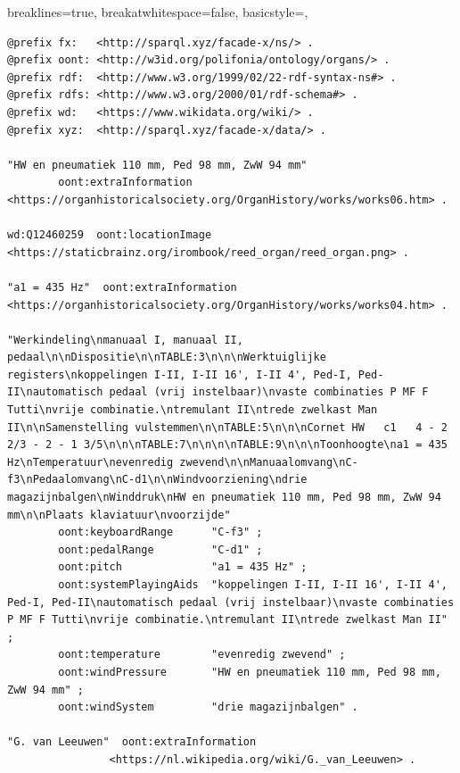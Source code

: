 \lstset
{
    breaklines=true,
    breakatwhitespace=false,
    basicstyle=\linespread{1}\ttfamily,
}
\begin{lstlisting}[caption={Part14\_000GravenhageNoorderkerk}]
@prefix fx:   <http://sparql.xyz/facade-x/ns/> .
@prefix oont: <http://w3id.org/polifonia/ontology/organs/> .
@prefix rdf:  <http://www.w3.org/1999/02/22-rdf-syntax-ns#> .
@prefix rdfs: <http://www.w3.org/2000/01/rdf-schema#> .
@prefix wd:   <https://www.wikidata.org/wiki/> .
@prefix xyz:  <http://sparql.xyz/facade-x/data/> .

"HW en pneumatiek 110 mm, Ped 98 mm, ZwW 94 mm"
        oont:extraInformation  <https://organhistoricalsociety.org/OrganHistory/works/works06.htm> .

wd:Q12460259  oont:locationImage  <https://staticbrainz.org/irombook/reed_organ/reed_organ.png> .

"a1 = 435 Hz"  oont:extraInformation  <https://organhistoricalsociety.org/OrganHistory/works/works04.htm> .

"Werkindeling\nmanuaal I, manuaal II, pedaal\n\nDispositie\n\nTABLE:3\n\n\nWerktuiglijke registers\nkoppelingen I-II, I-II 16', I-II 4', Ped-I, Ped-II\nautomatisch pedaal (vrij instelbaar)\nvaste combinaties P MF F Tutti\nvrije combinatie.\ntremulant II\ntrede zwelkast Man II\n\nSamenstelling vulstemmen\n\nTABLE:5\n\n\nCornet HW   c1   4 - 2 2/3 - 2 - 1 3/5\n\n\nTABLE:7\n\n\n\nTABLE:9\n\n\nToonhoogte\na1 = 435 Hz\nTemperatuur\nevenredig zwevend\n\nManuaalomvang\nC-f3\nPedaalomvang\nC-d1\n\nWindvoorziening\ndrie magazijnbalgen\nWinddruk\nHW en pneumatiek 110 mm, Ped 98 mm, ZwW 94 mm\n\nPlaats klaviatuur\nvoorzijde"
        oont:keyboardRange      "C-f3" ;
        oont:pedalRange         "C-d1" ;
        oont:pitch              "a1 = 435 Hz" ;
        oont:systemPlayingAids  "koppelingen I-II, I-II 16', I-II 4', Ped-I, Ped-II\nautomatisch pedaal (vrij instelbaar)\nvaste combinaties P MF F Tutti\nvrije combinatie.\ntremulant II\ntrede zwelkast Man II" ;
        oont:temperature        "evenredig zwevend" ;
        oont:windPressure       "HW en pneumatiek 110 mm, Ped 98 mm, ZwW 94 mm" ;
        oont:windSystem         "drie magazijnbalgen" .

"G. van Leeuwen"  oont:extraInformation
                <https://nl.wikipedia.org/wiki/G._van_Leeuwen> .


\end{lstlisting}
